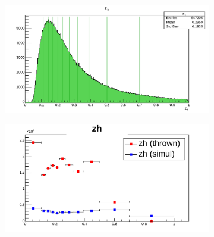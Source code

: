 \begin{figure}[hbtp]
        \begin{subfigure}{.5\textwidth}
            \centering
            \includegraphics[width=\linewidth]{13dataanalysis/img/40_accbins_zh.pdf}
            \label{fig::acc_corr_bins_zh}
        \end{subfigure}
        \begin{subfigure}{.5\textwidth}
            \centering
            \includegraphics[width=\linewidth]{13dataanalysis/img/40_acccorr_zh.pdf}
            \label{fig::acc_corr_zh}
        \end{subfigure}


\end{figure}
